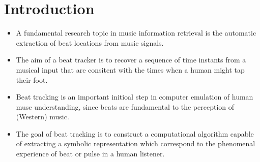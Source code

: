 \documentclass{scrartcl}
\begin{document}
\newpage


\section{Introduction}

\begin{itemize}
\item A fundamental research topic in music information retrieval is the automatic extraction of beat locations from music signals. 
\item The aim of a beat tracker is to recover a sequence of time instants from a musical input that are consitent with the times when a human might tap their foot. \cite{Ellis2007}
\item Beat tracking is an important initioal step in computer emulation of human musc understanding, since beats are fundamental to the perception of (Western) music.
\item The goal of beat tracking is to construct a computational algorithm capable of extracting a symbolic representation which correspond to the phenomenal experience of beat or pulse in a human listener.
\end{itemize}
\end{document}
